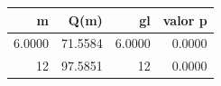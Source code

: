 \begin{tabular}{rrrr}
\toprule
m & Q(m) & gl & valor p \\
\midrule
6.0000 & 71.5584 & 6.0000 & 0.0000 \\
12 & 97.5851 & 12 & 0.0000 \\
\bottomrule
\end{tabular}
